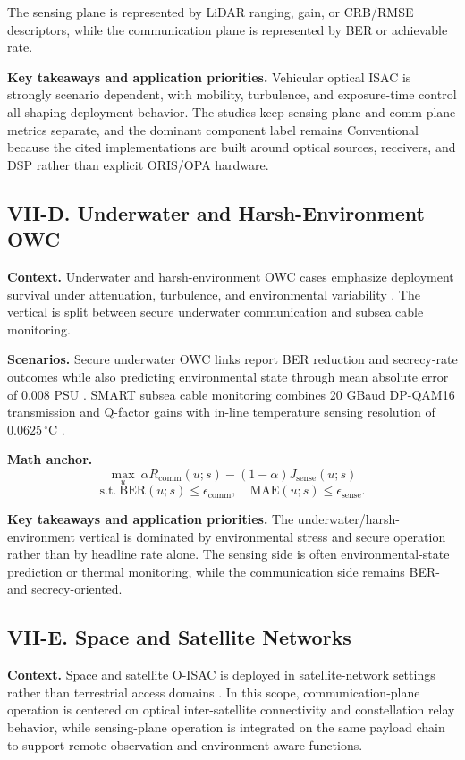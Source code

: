 The sensing plane is represented by LiDAR ranging, gain, or CRB/RMSE descriptors, while the communication plane is represented by BER or achievable rate.

\textbf{Key takeaways and application priorities.} Vehicular optical ISAC is strongly scenario dependent, with mobility, turbulence, and exposure-time control all shaping deployment behavior. The studies keep sensing-plane and comm-plane metrics separate, and the dominant component label remains Conventional because the cited implementations are built around optical sources, receivers, and DSP rather than explicit ORIS/OPA hardware.

\subsection{VII-D. Underwater and Harsh-Environment OWC}

\textbf{Context.} Underwater and harsh-environment OWC cases emphasize deployment survival under attenuation, turbulence, and environmental variability \cite{O_ISAC_127,O_ISAC_220}. The vertical is split between secure underwater communication and subsea cable monitoring.

\textbf{Scenarios.} Secure underwater OWC links report BER reduction and secrecy-rate outcomes while also predicting environmental state through mean absolute error of 0.008 PSU \cite{O_ISAC_127}. SMART subsea cable monitoring combines 20 GBaud DP-QAM16 transmission and Q-factor gains with in-line temperature sensing resolution of $0.0625\,^{\circ}\mathrm{C}$ \cite{O_ISAC_220}.

\textbf{Math anchor.}
\[
\max_u\ \alpha R_{\mathrm{comm}}(u;s)-(1-\alpha)J_{\mathrm{sense}}(u;s)
\]
\[
\text{s.t.}\ \mathrm{BER}(u;s)\le \epsilon_{\mathrm{comm}},\quad \mathrm{MAE}(u;s)\le \epsilon_{\mathrm{sense}}.
\]

\textbf{Key takeaways and application priorities.} The underwater/harsh-environment vertical is dominated by environmental stress and secure operation rather than by headline rate alone. The sensing side is often environmental-state prediction or thermal monitoring, while the communication side remains BER- and secrecy-oriented.

\subsection{VII-E. Space and Satellite Networks}

\textbf{Context.} Space and satellite O-ISAC is deployed in satellite-network settings rather than terrestrial access domains \cite{O_ISAC_089,O_ISAC_137,O_ISAC_187,O_ISAC_195}. In this scope, communication-plane operation is centered on optical inter-satellite connectivity and constellation relay behavior, while sensing-plane operation is integrated on the same payload chain to support remote observation and environment-aware functions.

